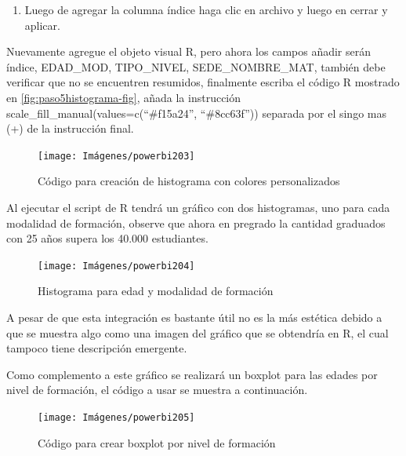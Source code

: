 \documentclass[
]{book}
\providecommand{\tightlist}{%
  \setlength{\itemsep}{0pt}\setlength{\parskip}{0pt}}
\begin{document}
\begin{enumerate}
\def\labelenumi{\arabic{enumi}.}
\setcounter{enumi}{2}
\tightlist
\item
  Luego de agregar la columna índice haga clic en archivo y luego en cerrar y aplicar.
\end{enumerate}

Nuevamente agregue el objeto visual R, pero ahora los campos añadir serán índice, EDAD\_MOD, TIPO\_NIVEL, SEDE\_NOMBRE\_MAT, también debe verificar que no se encuentren resumidos, finalmente escriba el código R mostrado en \ref{fig:paso5histograma-fig}, añada la instrucción scale\_fill\_manual(values=c(``\#f15a24'', ``\#8cc63f'')) separada por el singo mas (+) de la instrucción final.

\begin{figure}

{\centering \texttt{[image: Imágenes/powerbi203]} 

}

\caption{Código para creación de histograma con colores personalizados}\label{fig:correccionhistogramacodigo-fig}
\end{figure}

Al ejecutar el script de R tendrá un gráfico con dos histogramas, uno para cada modalidad de formación, observe que ahora en pregrado la cantidad graduados con 25 años supera los 40.000 estudiantes.

\begin{figure}

{\centering \texttt{[image: Imágenes/powerbi204]} 

}

\caption{Histograma para edad y modalidad de formación}\label{fig:histogramapowerbi-fig}
\end{figure}

A pesar de que esta integración es bastante útil no es la más estética debido a que se muestra algo como una imagen del gráfico que se obtendría en R, el cual tampoco tiene descripción emergente.

Como complemento a este gráfico se realizará un boxplot para las edades por nivel de formación, el código a usar se muestra a continuación.

\begin{figure}

{\centering \texttt{[image: Imágenes/powerbi205]} 

}

\caption{Código para crear boxplot por nivel de formación}\label{fig:codigoboxplotpowerbi-fig}
\end{figure}
\end{document}
